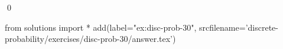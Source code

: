 
\begin{ex} 
  \label{ex:disc-prob-30}
  
  \qed
\end{ex} 
\begin{python0}
from solutions import *
add(label="ex:disc-prob-30",
    srcfilename='discrete-probability/exercises/disc-prob-30/answer.tex') 
\end{python0}
